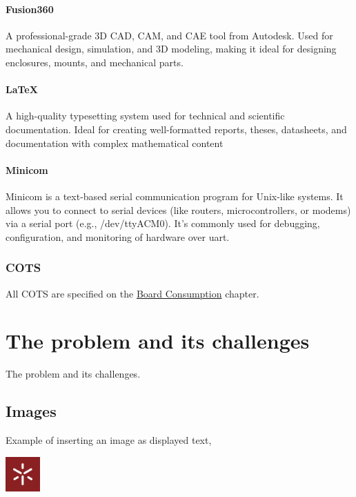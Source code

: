 \subsubsection{Fusion360}
A professional-grade 3D CAD, CAM, and CAE tool from Autodesk. Used for mechanical design, simulation, and 3D modeling, making it ideal for designing enclosures, mounts, and mechanical parts.
\subsubsection{\LaTeX}
A high-quality typesetting system used for technical and scientific documentation. Ideal for creating well-formatted reports, theses, datasheets, and documentation with complex mathematical content
\subsubsection{Minicom}
Minicom is a text-based serial communication program for Unix-like systems. It allows you to connect to serial devices (like routers, microcontrollers, or modems) via a serial port (e.g., /dev/ttyACM0). It's commonly used for debugging, configuration, and monitoring of hardware over \acrshort{uart}.
\subsection{COTS}
All COTS are specified on the \hyperref[link:Board Consumption]{Board Consumption} chapter.

\chapter{The problem and its challenges}

The problem and its challenges.

\section{Images}
Example of inserting an image as displayed text,
\begin{center}
	\includegraphics[width=0.1\textwidth]{images/UM.jpg}
\end{center}

